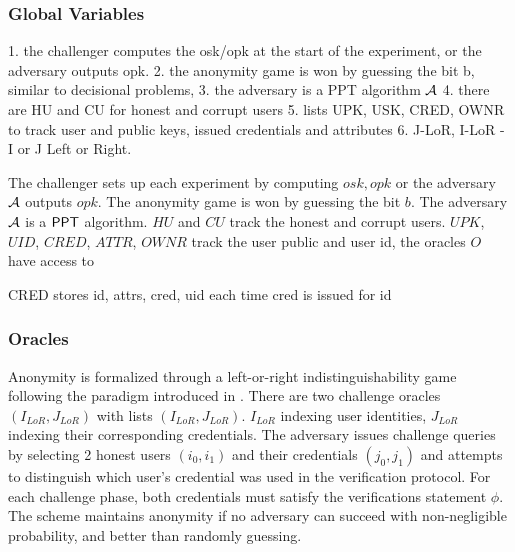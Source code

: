 \subsubsection{Global Variables}
1. the challenger computes the osk/opk at the start of the experiment, or the adversary outputs opk. 
2. the anonymity game is won by guessing the bit b, similar to decisional problems, 
3. the adversary is a PPT algorithm $\mathcal{A}$
4. there are HU and CU for honest and corrupt users
5. lists UPK, USK, CRED, OWNR to track user and public keys, issued credentials and attributes
6. J-LoR, I-LoR - I or J Left or Right. 

The challenger sets up each experiment by computing $osk, opk$ or the adversary $\mathcal{A}$ outputs $opk$. The anonymity game is won by guessing the bit $b$. The adversary $\mathcal{A}$ is a $\mathsf{PPT}$ algorithm. 
$HU$ and $CU$ track the honest and corrupt users. $UPK$, $UID$, $CRED$, $ATTR$, $OWNR$ track the user public and user id, the oracles $O$ have access to 




CRED stores id, attrs, cred, uid each time cred is issued for id

\subsubsection{Oracles}

Anonymity is formalized through a left-or-right indistinguishability game following the paradigm introduced in \cite{vaudenay_security_2006}. There are two challenge oracles $(I_{LoR}, J_{LoR})$ with lists $(I_{LoR}, J_{LoR})$. $I_{LoR}$ indexing user identities, $J_{LoR}$ indexing their corresponding credentials. The adversary issues challenge queries by selecting 2 honest users $(i_0, i_1)$ and their credentials $(j_0, j_1)$ and attempts to distinguish which user's credential was used in the verification protocol. For each challenge phase, both credentials must satisfy the verifications statement $\phi$. The scheme maintains anonymity if no adversary can succeed with non-negligible probability, and better than randomly guessing.

